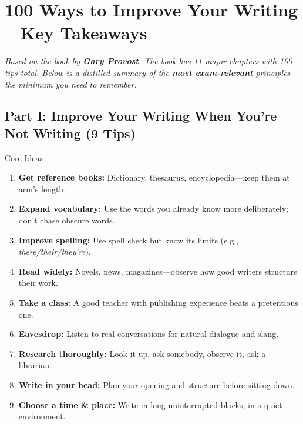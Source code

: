 \documentclass[12pt,a4paper]{article}
\begin{document}
\section{100 Ways to Improve Your Writing -- Key Takeaways}

\textit{Based on the book by \textbf{Gary Provost}. The book has 11 major chapters with 100 tips total. Below is a distilled summary of the \textbf{most exam-relevant} principles -- the minimum you need to remember.}

\subsection{Part I: Improve Your Writing When You're Not Writing (9 Tips)}

\begin{keybox}{Core Ideas}
\begin{enumerate}[noitemsep]
    \item \textbf{Get reference books:} Dictionary, thesaurus, encyclopedia---keep them at arm's length.
    \item \textbf{Expand vocabulary:} Use the words you already know more deliberately; don't chase obscure words.
    \item \textbf{Improve spelling:} Use spell check but know its limits (e.g., \textit{there/their/they're}).
    \item \textbf{Read widely:} Novels, news, magazines---observe how good writers structure their work.
    \item \textbf{Take a class:} A good teacher with publishing experience beats a pretentious one.
    \item \textbf{Eavesdrop:} Listen to real conversations for natural dialogue and slang.
    \item \textbf{Research thoroughly:} Look it up, ask somebody, observe it, ask a librarian.
    \item \textbf{Write in your head:} Plan your opening and structure before sitting down.
    \item \textbf{Choose a time \& place:} Write in long uninterrupted blocks, in a quiet environment.
\end{enumerate}
\end{keybox}
\end{document}
